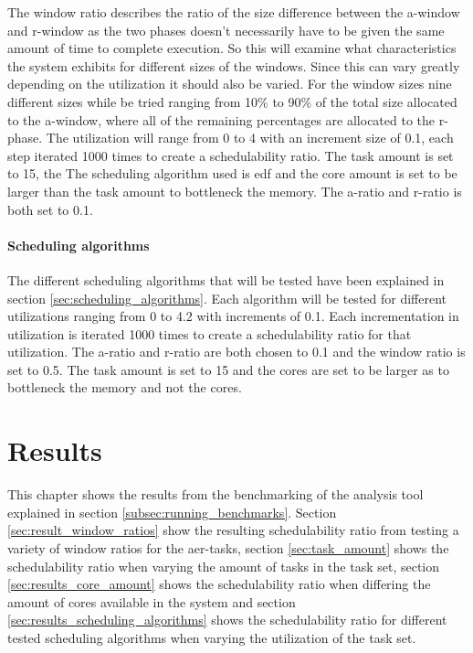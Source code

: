 \documentclass{kththesis}
\begin{document}
The window ratio describes the ratio of the size difference between the \acrshort{a}-window and
\acrshort{r}-window as the two phases doesn't necessarily have to be given the same amount of time
to complete execution. So this will examine what characteristics the system exhibits for different
sizes of the windows. Since this can vary greatly depending on the utilization it should also be
varied. For the window sizes nine different sizes while be tried ranging from 10\% to 90\% of the
total size allocated to the \acrshort{a}-window, where all of the remaining percentages are
allocated to the \acrshort{r}-phase. The utilization will range from 0 to 4 with an increment size
of 0.1, each step iterated 1000 times to create a schedulability ratio. The task amount is set to
15, the The scheduling algorithm used is \acrshort{edf} and the core amount is set to be larger than
the task amount to bottleneck the memory. The \acrshort{a}-ratio and \acrshort{r}-ratio is both set
to 0.1.

\subsubsection{Scheduling algorithms}

The different scheduling algorithms that will be tested have been explained in section
\ref{sec:scheduling_algorithms}. Each algorithm will be tested for different utilizations ranging
from 0 to 4.2 with increments of 0.1. Each incrementation in utilization is iterated 1000 times to
create a schedulability ratio for that utilization. The \acrshort{a}-ratio and \acrshort{r}-ratio
are both chosen to 0.1 and the window ratio is set to 0.5. The task amount is set to 15 and the
cores are set to be larger as to bottleneck the memory and not the cores.


\chapter{Results} \label{ch:result}

This chapter shows the results from the benchmarking of the analysis tool explained in section
\ref{subsec:running_benchmarks}. Section \ref{sec:result_window_ratios} show the resulting
schedulability ratio from testing a variety of window ratios for the \acrshort{aer}-tasks, section
\ref{sec:task_amount} shows the schedulability ratio when varying the amount of tasks in the task
set, section \ref{sec:results_core_amount} shows the schedulability ratio when differing the amount of cores
available in the system and section \ref{sec:results_scheduling_algorithms} shows the schedulability
ratio for different tested scheduling algorithms when varying the utilization of the task set.
\end{document}
